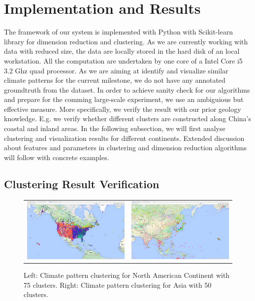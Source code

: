 \section{Implementation and Results}
The framework of our system is implemented with Python with Scikit-learn library for dimension reduction and clustering.
As we are currently working with data with reduced size, the data are locally stored in the hard disk of an local workstation.
All the computation are undertaken by one core of a Intel Core i5 3.2 Ghz quad processor.
As we are aiming at identify and visualize similar climate patterns for the current milestone, we do not have any annotated groundtruth from the dataset.
In order to achieve sanity check for our algorithms and prepare for the comming large-scale experiment, we use an ambiguious but effective measure.
More specifically, we verify the result with our prior geology knowledge. E.g. we verify whether different clusters are constructed along China's coastal and inland areas.
In the following subsection, we will first analyse clustering and visualization results for different continents.
Extended discussion about features and parameters in clustering and dimension reduction algorithms will follow with concrete examples.

\subsection{Clustering Result Verification}
\begin{figure}
    \centering
    \begin{tabular}{c c}
        \includegraphics[width=.45\linewidth]{./figure/Ave_60_comp_75_clu_USA.png}
        & \includegraphics[width=.45\linewidth]{./figure/Ave_60_comp_50_clu_Asia.png}
    \end{tabular}
    \caption{Left: Climate pattern clustering for North American Continent with 75 clusters. Right: Climate pattern clustering for Asia with 50 clusters.}
    \label{fig:AsiaUSAVer}
\end{figure}

